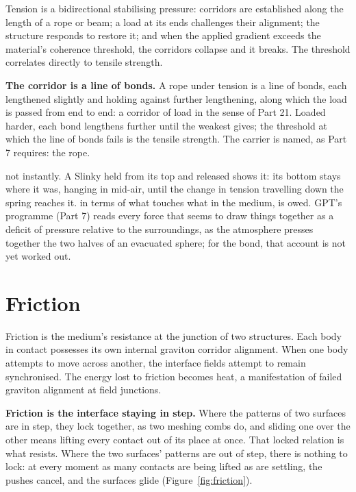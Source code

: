 \documentclass[11pt,a4paper]{article}
\begin{document}
Tension is a bidirectional stabilising pressure: corridors are established along the length of a rope or beam; a load at its ends challenges their alignment; the structure responds to restore it; and when the applied gradient exceeds the material's coherence threshold, the corridors collapse and it breaks. The threshold correlates directly to tensile strength.

\begin{hypbar}
\textbf{The corridor is a line of bonds.} A rope under tension is a line of bonds, each lengthened slightly and holding against further lengthening, along which the load is passed from end to end: a corridor of load in the sense of Part 21. Loaded harder, each bond lengthens further until the weakest gives; the threshold at which the line of bonds fails is the tensile strength. The carrier is named, as Part 7 requires: the rope.
\end{hypbar}

 not instantly. A Slinky held from its top and released shows it: its bottom stays where it was, hanging in mid-air, until the change in tension travelling down the spring reaches it.  in terms of what touches what in the medium, is owed. GPT's programme (Part 7) reads every force that seems to draw things together as a deficit of pressure relative to the surroundings, as the atmosphere presses together the two halves of an evacuated sphere; for the bond, that account is not yet worked out.

\section{Friction}

Friction is the medium's resistance at the junction of two structures. Each body in contact possesses its own internal graviton corridor alignment. When one body attempts to move across another, the interface fields attempt to remain synchronised. The energy lost to friction becomes heat, a manifestation of failed graviton alignment at field junctions.

\begin{hypbar}
\textbf{Friction is the interface staying in step.} Where the patterns of two surfaces are in step, they lock together, as two meshing combs do, and sliding one over the other means lifting every contact out of its place at once. That locked relation is what resists. Where the two surfaces' patterns are out of step, there is nothing to lock: at every moment as many contacts are being lifted as are settling, the pushes cancel, and the surfaces glide (Figure~\ref{fig:friction}).
\end{hypbar}
\end{document}
